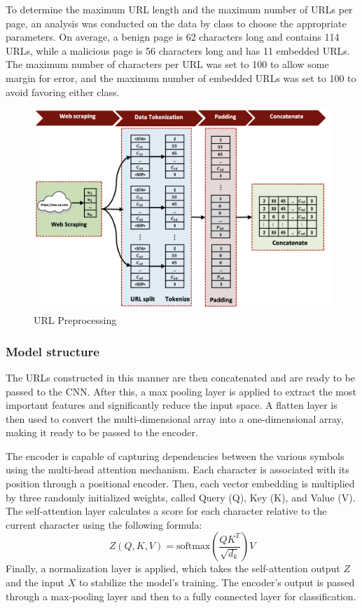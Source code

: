 To determine the maximum URL length and the maximum number of URLs per page, an analysis was conducted on the data by class to choose the appropriate parameters. On average, a benign page is 62 characters long and contains 114 URLs, while a malicious page is 56 characters long and has 11 embedded URLs. The maximum number of characters per URL was set to 100 to allow some margin for error, and the maximum number of embedded URLs was set to 100 to avoid favoring either class.
\begin{figure}[htp]
    \centering
    \includegraphics[width=0.8\linewidth]{images/transformer preprocessing.png}
    \caption{URL Preprocessing}
    \label{fig:URL Preprocessing}
\end{figure}

\subsubsection{Model structure}
The URLs constructed in this manner are then concatenated and are ready to be passed to the CNN. After this, a max pooling layer is applied to extract the most important features and significantly reduce the input space. A flatten layer is then used to convert the multi-dimensional array into a one-dimensional array, making it ready to be passed to the encoder.

The encoder is capable of capturing dependencies between the various symbols using the multi-head attention mechanism. Each character is associated with its position through a positional encoder. Then, each vector embedding is multiplied by three randomly initialized weights, called Query (Q), Key (K), and Value (V). The self-attention layer calculates a score for each character relative to the current character using the following formula:
\begin{equation}
Z(Q, K, V) = \text{softmax}\left(\frac{QK^T}{\sqrt{d_k}}\right)V
\end{equation}
Finally, a normalization layer is applied, which takes the self-attention output \(Z\) and the input \(X\) to stabilize the model's training. The encoder's output is passed through a max-pooling layer and then to a fully connected layer for classification.

